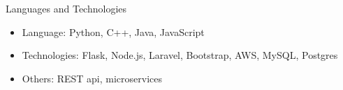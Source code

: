 \documentclass[]{mcdowellcv}
\begin{document}
		
	
	\begin{cvsection}{Languages and Technologies}
		\begin{cvsubsection}{}{}{}	
			\begin{itemize}
				\item Language: Python, C++, Java, JavaScript
				\item Technologies: Flask, Node.js, Laravel, Bootstrap, AWS, MySQL, Postgres
				\item Others: REST api, microservices
			\end{itemize}
		\end{cvsubsection}
	\end{cvsection}
	
\end{document}

